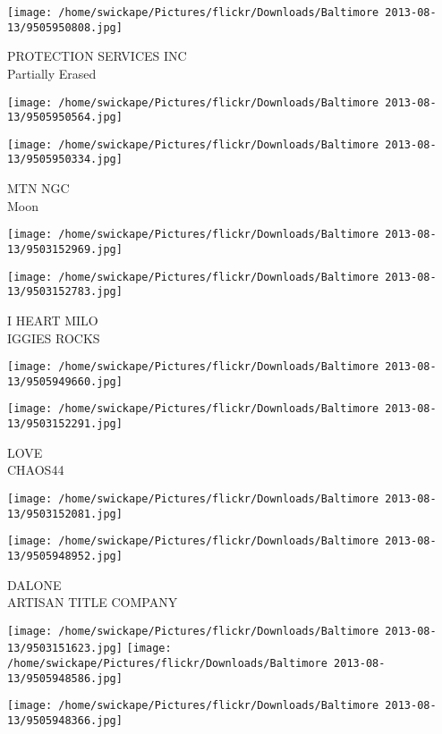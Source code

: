 \documentclass[10pt,letterpaper]{article}
\begin{document}
\vspace{0.25in}
\texttt{[image: /home/swickape/Pictures/flickr/Downloads/Baltimore 2013-08-13/9505950808.jpg]}

PROTECTION SERVICES INC\\
Partially Erased
\pagebreak

\texttt{[image: /home/swickape/Pictures/flickr/Downloads/Baltimore 2013-08-13/9505950564.jpg]}

\vspace{0.25in}
\texttt{[image: /home/swickape/Pictures/flickr/Downloads/Baltimore 2013-08-13/9505950334.jpg]}

MTN NGC\\
Moon
\pagebreak

\texttt{[image: /home/swickape/Pictures/flickr/Downloads/Baltimore 2013-08-13/9503152969.jpg]}

\vspace{0.25in}
\texttt{[image: /home/swickape/Pictures/flickr/Downloads/Baltimore 2013-08-13/9503152783.jpg]}

I HEART MILO\\
IGGIES ROCKS
\pagebreak

\texttt{[image: /home/swickape/Pictures/flickr/Downloads/Baltimore 2013-08-13/9505949660.jpg]}

\vspace{0.25in}
\texttt{[image: /home/swickape/Pictures/flickr/Downloads/Baltimore 2013-08-13/9503152291.jpg]}

LOVE\\
CHAOS44
\pagebreak

\texttt{[image: /home/swickape/Pictures/flickr/Downloads/Baltimore 2013-08-13/9503152081.jpg]}

\vspace{0.25in}
\texttt{[image: /home/swickape/Pictures/flickr/Downloads/Baltimore 2013-08-13/9505948952.jpg]}

DALONE\\
ARTISAN TITLE COMPANY
\pagebreak

\texttt{[image: /home/swickape/Pictures/flickr/Downloads/Baltimore 2013-08-13/9503151623.jpg]}
\texttt{[image: /home/swickape/Pictures/flickr/Downloads/Baltimore 2013-08-13/9505948586.jpg]}

\vspace{0.25in}
\texttt{[image: /home/swickape/Pictures/flickr/Downloads/Baltimore 2013-08-13/9505948366.jpg]}
\end{document}
